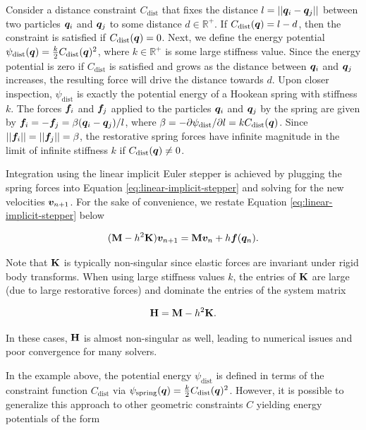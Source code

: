 Consider a distance constraint $C_{\text{dist}}$ that 
fixes the distance $l = \vert \vert \bm{q}_i - \bm{q}_j \vert \vert$ between two particles $\bm{q}_i$ and $\bm{q}_j$ to 
some distance $d \in \mathbb{R}^+$. If $C_{\text{dist}}(\bm{q}) = l - d$, then the constraint is satisfied if 
$C_{\text{dist}}(\bm{q}) = 0$. Next, we define the energy potential $\psi_\text{dist}(\bm{q}) = \frac{k}{2}C_\text{dist}(\bm{q})^2$,
where $k \in \mathbb{R}^+$ is some large stiffness value. Since the energy potential is zero if $C_\text{dist}$ is satisfied
and grows as the distance between $\bm{q}_i$ and $\bm{q}_j$ increases, the resulting force will drive the distance towards $d$.
Upon closer inspection, $\psi_\text{dist}$ is exactly the potential energy of a Hookean spring with stiffness $k$. The forces 
$\bm{f}_i$ and $\bm{f}_j$ applied to the particles $\bm{q}_i$ and $\bm{q}_j$ by the spring are given by 
$\bm{f}_i = -\bm{f}_j = \beta (\bm{q}_i - \bm{q}_j) / l$, where $\beta = -\partial\psi_\text{dist}/\partial l = 
kC_\text{dist}(\bm{q})$. Since $\vert \vert \bm{f}_i \vert \vert = \vert \vert \bm{f}_j \vert \vert = \beta$,
the restorative spring forces have infinite magnitude in the limit of infinite stiffness $k$ if $C_\text{dist}(\bm{q}) \neq 0$. 

Integration using the linear implicit Euler stepper is achieved by plugging the spring forces into 
Equation \ref{eq:linear-implicit-stepper} and solving for the new velocities $\bm{v}_{n+1}$. For the sake of convenience, we restate
Equation \ref{eq:linear-implicit-stepper} below

\[
    (\mathbf{M} - h^2\mathbf{K})\bm{v}_{n+1} = \mathbf{M}\bm{v}_n + h\bm{f}(\bm{q}_n).
\]

\noindent Note that $\mathbf{K}$ is typically non-singular since elastic forces are invariant under rigid body transforms. When using 
large stiffness values $k$, the entries of $\mathbf{K}$ are large (due to large restorative forces) and dominate the entries of the 
system matrix 

\begin{equation}\label{eq:system-H}
    \mathbf{H} = \mathbf{M} - h^2\mathbf{K}.
\end{equation}

\noindent In these cases, $\mathbf{H}$ is almost non-singular as well, leading to numerical issues and poor convergence for many solvers. 

In the example above, the potential energy $\psi_\text{dist}$ is defined in terms of the constraint function $C_\text{dist}$ via 
$\psi_\text{spring}(\bm{q}) = \frac{k}{2} C_\text{dist}(\bm{q})^2$. However, it is possible to generalize this approach to other 
geometric constraints $C$ yielding energy potentials of the form

